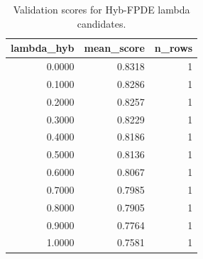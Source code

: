 \begin{table}[t]
\caption{Validation scores for Hyb-FPDE lambda candidates.}
\label{tab:lambda_distribution_computed}
\centering
\begin{tabular}{rrr}
\toprule
lambda\_hyb & mean\_score & n\_rows \\
\midrule
0.0000 & 0.8318 & 1 \\
0.1000 & 0.8286 & 1 \\
0.2000 & 0.8257 & 1 \\
0.3000 & 0.8229 & 1 \\
0.4000 & 0.8186 & 1 \\
0.5000 & 0.8136 & 1 \\
0.6000 & 0.8067 & 1 \\
0.7000 & 0.7985 & 1 \\
0.8000 & 0.7905 & 1 \\
0.9000 & 0.7764 & 1 \\
1.0000 & 0.7581 & 1 \\
\bottomrule
\end{tabular}

\end{table}
